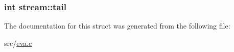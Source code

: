 \hypertarget{structstream_a87d56d1718d31df122ffdb24130fc057}{
\subsubsection[{tail}]{\setlength{\rightskip}{0pt plus 5cm}int stream\-::tail}}\label{structstream_a87d56d1718d31df122ffdb24130fc057}


The documentation for this struct was generated from the following file\-:\begin{DoxyCompactItemize}
\item 
src/\hyperlink{eva_8c}{eva.\-c}\end{DoxyCompactItemize}
